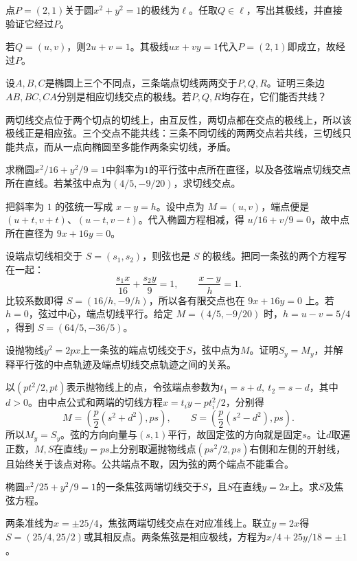 点\(P=(2,1)\)关于圆\(x^2+y^2=1\)的极线为\(\ell\)。任取\(Q\in\ell\)，写出其极线，并直接验证它经过\(P\)。
\par
\solutionanswer
若\(Q=(u,v)\)，则\(2u+v=1\)。其极线\(ux+vy=1\)代入\(P=(2,1)\)即成立，故经过\(P\)。


设\(A,B,C\)是椭圆上三个不同点，三条端点切线两两交于\(P,Q,R\)。证明三条边\(AB,BC,CA\)分别是相应切线交点的极线。若\(P,Q,R\)均存在，它们能否共线？
\par
\solutionanswer
两切线交点位于两个切点的切线上，由互反性，两切点都在交点的极线上，所以该极线正是相应弦。三个交点不能共线：三条不同切线的两两交点若共线，三切线只能共点，而从一点向椭圆至多能作两条实切线，矛盾。


求椭圆\(x^2/16+y^2/9=1\)中斜率为\(1\)的平行弦中点所在直径，以及各弦端点切线交点所在直线。若某弦中点为\((4/5,-9/20)\)，求切线交点。
\par
\solutionanswer
把斜率为 \(1\) 的弦统一写成 \(x-y=h\)。设中点为 \(M=(u,v)\)，端点便是 \((u+t,v+t)\)、\((u-t,v-t)\)。代入椭圆方程相减，得 \(u/16+v/9=0\)，故中点所在直径为 \(9x+16y=0\)。

设端点切线相交于 \(S=(s_1,s_2)\)，则弦也是 \(S\) 的极线。把同一条弦的两个方程写在一起：
\[
 \frac{s_1x}{16}+\frac{s_2y}{9}=1,\qquad \frac{x-y}{h}=1.
\]
比较系数即得 \(S=(16/h,-9/h)\)，所以各有限交点也在 \(9x+16y=0\) 上。若 \(h=0\)，弦过中心，端点切线平行。给定 \(M=(4/5,-9/20)\) 时，\(h=u-v=5/4\)，得到 \(S=(64/5,-36/5)\)。


设抛物线\(y^2=2px\)上一条弦的端点切线交于\(S\)，弦中点为\(M\)。证明\(S_y=M_y\)，并解释平行弦的中点轨迹及端点切线交点轨迹之间的关系。
\par
\solutionanswer
以\((pt^2/2,pt)\)表示抛物线上的点，令弦端点参数为\(t_1=s+d,\ t_2=s-d\)，其中\(d>0\)。由中点公式和两端的切线方程\(x=t_i y-pt_i^2/2\)，分别得
\[
 M=\left(\frac p2(s^2+d^2),ps\right),\qquad
 S=\left(\frac p2(s^2-d^2),ps\right).
\]
所以\(M_y=S_y\)。弦的方向向量与\((s,1)\)平行，故固定弦的方向就是固定\(s\)。让\(d\)取遍正数，\(M,S\)在直线\(y=ps\)上分别取遍抛物线点\((ps^2/2,ps)\)右侧和左侧的开射线，且始终关于该点对称。公共端点不取，因为弦的两个端点不能重合。


椭圆\(x^2/25+y^2/9=1\)的一条焦弦两端切线交于\(S\)，且\(S\)在直线\(y=2x\)上。求\(S\)及焦弦方程。
\par
\solutionanswer
两条准线为\(x=\pm25/4\)，焦弦两端切线交点在对应准线上。联立\(y=2x\)得\(S=(25/4,25/2)\)或其相反点。两条焦弦是相应极线，方程为\(x/4+25y/18=\pm1\)。


